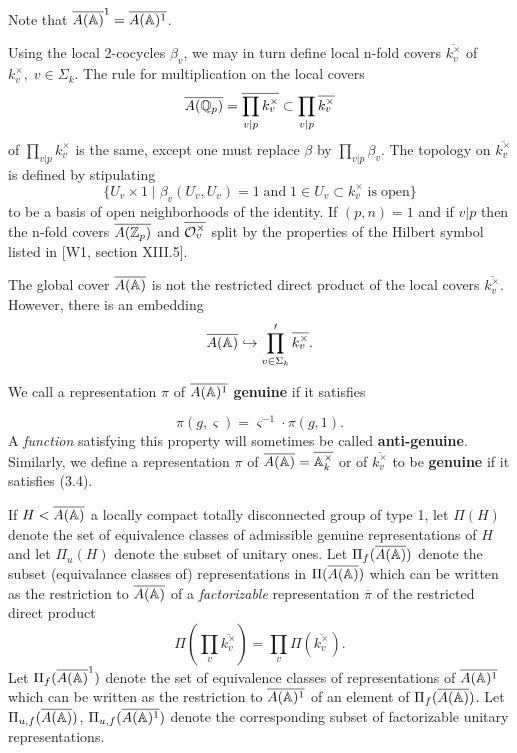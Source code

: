 Note that
$\overline{A({\Bbb{A}})}^1=\overline{A({\Bbb{A}})^1}$.

Using the local 2-cocycles $\beta _v$, we may in turn define local n-fold
covers $\overline{k_v^{\times }}$ of $k_v^{\times },\;v\in \Sigma _k$. The
rule for multiplication on the local covers
\[
\overline{A({\Bbb{Q}}_p)}=
\overline{\prod_{v|p}k_v^{\times }}
\subset \prod_{v|p}
\overline{k_v^{\times }}
\]
of $\prod_{v|p}k_v^{\times }$ is the same, except one must
replace $\beta $ by $\prod_{v|p}\beta _v$. The topology on
$\overline{k_v^{\times }}$
is defined by stipulating 
\[
\{U_v\times 1\;|\;\beta _v(U_v,U_v)=1\;\mathrm{and}\;1\in U_v\subset
k_v^{\times }\;\mathrm{is\;open}\}
\]
to be a basis of open neighborhoods of the identity.
If $(p,n)=1$ and if $v|p$ then the n-fold covers
$\overline{A(\Bbb{Z}_p)}$ and
$\overline{{\cal{O}}_v^{\times }}$ split by
the properties of the Hilbert symbol listed in [W1,
section XIII.5].

The global cover $\overline{A({\Bbb{A}})}$ is not the restricted direct
product of the local covers $\overline{k_v^{\times }}$. However, there is an
embedding 
\[
\overline{A({\Bbb{A}})}\hookrightarrow
\prod_{v\in \Sigma _k}^{\prime }\overline{k_v^{\times }}.
\]

We call a representation $\pi $ of $\overline{A({\Bbb{A}})^1}$
\textbf{genuine} if it satisfies

\begin{equation}
\pi (g,\varsigma )=\varsigma^{-1} \cdot \pi (g,1).
\end{equation}
A {\em function} satisfying this property will sometimes be
called {\bf anti-genuine}.
Similarly, we define a representation $\pi $ of
$\overline{A({\Bbb{A}})}=\overline{{\Bbb{A}}_k^{\times }}$ or
of $\overline{k_v^{\times }}$ to be 
\textbf{genuine} if it satisfies (3.4).

If $H<\overline{A({\Bbb{A}})}$ a locally compact totally disconnected group
of type 1, let $\Pi (H)$ denote
the set of equivalence classes of admissible genuine
representations of $H$ and
let $\Pi_u(H)$ denote the subset of unitary ones.
Let $\Pi_f (\overline{A({\Bbb{A}})})$
denote the subset (equivalance classes of) representations in
$\Pi(\overline{A({\Bbb{A}})})$ which can be written as the
restriction to $\overline{A({\Bbb{A}})}$
of a {\em factorizable} representation $\overline{\pi }$
of the restricted direct product 
\[
\Pi (\prod_v\overline{k_v^{\times }})=\prod_v
\Pi (\overline{k_v^{\times }}).
\]
Let $\Pi_f (\overline{A({\Bbb{A}})}^1)$ denote the
set of equivalence classes of
representations of $\overline{A({\Bbb{A}})^1}$ which can be written as the
restriction to $\overline{A({\Bbb{A}})^1}$ of an element of
$\Pi_f (\overline{A({\Bbb{A}})})$.
Let $\Pi_{u,f} (\overline{A({\Bbb{A}})})$,
$\Pi_{u,f} (\overline{A({\Bbb{A}})^1})$
denote the corresponding subset of factorizable unitary representations.

